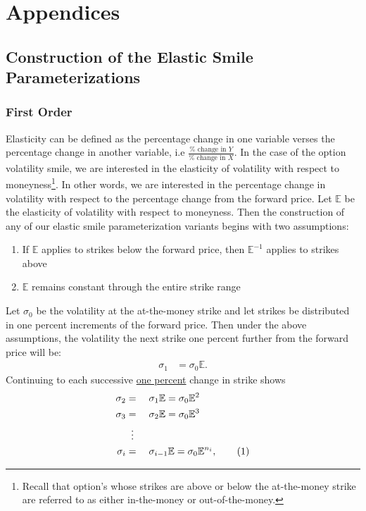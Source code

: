 \documentclass[12pt, a4paper, notitlepage]{article}
\numberwithin{equation}{subsection}
\numberwithin{figure}{subsection}
\numberwithin{table}{subsection}
\newcommand\numberthis{\addtocounter{equation}{1}\tag{\theequation}}
\newcommand{\newpar}{\newline \newline}
\begin{document}
\newpage
\section{Appendices} \label{Appendicies}
\subsection{Construction of the Elastic Smile Parameterizations} \label{appendix:ElasticSmileDerivation}
\subsubsection{First Order} \label{subsec:FirstOrderSmileConstruction}
Elasticity can be defined as the percentage change in one variable verses the percentage change in another variable, i.e $\frac{\% \text{ change in } Y}{\% \text{ change in } X}$.  In the case of the option volatility smile, we are interested in the elasticity of volatility with respect to moneyness\footnote{Recall that option's whose strikes are above or below the at-the-money strike are referred to as either in-the-money or out-of-the-money.}.  In other words, we are interested in the percentage change in volatility with respect to the percentage change from the forward price.
\newpar
Let $\mathbb{E}$ be the elasticity of volatility with respect to moneyness.  Then the construction of any of our elastic smile parameterization variants begins with two assumptions:
\begin{enumerate}
\item If $\mathbb{E}$ applies to strikes below the forward price, then $\mathbb{E}^{-1}$ applies to strikes above \label{SkewInvertedAssumption}
\item $\mathbb{E}$ remains constant through the entire strike range
\end{enumerate}
  Let $\sigma_0$ be the volatility at the at-the-money strike and let strikes be distributed in one percent increments of the forward price.  Then under the above assumptions, the volatility the next strike one percent further from the forward price will be:
\begin{align*}
    \sigma_1 &= \sigma_0\mathbb{E}.
\end{align*}
Continuing to each successive \underline{one percent} change in strike shows
\begin{alignat*}{3}
    \sigma_2 &= &&\sigma_1\mathbb{E} = \sigma_0\mathbb{E}^{2} \\
    \sigma_3 &= &&\sigma_2\mathbb{E} = \sigma_0\mathbb{E}^{3} \\
        &\vdotswithin{=}\\
    \sigma_i &= &&\sigma_{i-1}\mathbb{E} = \sigma_0\mathbb{E}^{n_i}, \numberthis \label{eq:FirstOrderIthStrikeVol}
\end{alignat*}
\end{document}
